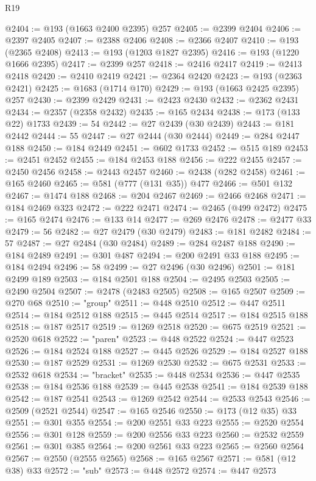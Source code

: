 \begin{lexlean}{R19}
\begin{coremodule}
@2404 := @193 (@1663 @2400 @2395) @257
@2405 := @2399 @2404
@2406 := @2397 @2405
@2407 := @2388 @2406
@2408 := @2366 @2407
@2410 := @193 (@2365 @2408)
@2413 := @193 (@1203 @1827 @2395)
@2416 := @193 (@1220 @1666 @2395)
@2417 := @2399 @257
@2418 := @2416 @2417
@2419 := @2413 @2418
@2420 := @2410 @2419
@2421 := @2364 @2420
@2423 := @193 (@2363 @2421)
@2425 := @1683 (@1714 @170)
@2429 := @193 (@1663 @2425 @2395) @257
@2430 := @2399 @2429
@2431 := @2423 @2430
@2432 := @2362 @2431
@2434 := @2357 (@2358 @2432)
@2435 := @165 @2434
@2438 := @173 (@133 @22) @1733
@2439 := 54
@2442 := @27 @2439 (@30 @2439)
@2443 := @181 @2442
@2444 := 55
@2447 := @27 @2444 (@30 @2444)
@2449 := @284 @2447 @188
@2450 := @184 @2449
@2451 := @602 @1733
@2452 := @515 @189
@2453 := @2451 @2452
@2455 := @184 @2453 @188
@2456 := @222 @2455
@2457 := @2450 @2456
@2458 := @2443 @2457
@2460 := @2438 (@282 @2458)
@2461 := @165 @2460
@2465 := @581 (@777 (@131 @35)) @477
@2466 := @501 @132
@2467 := @1474 @188
@2468 := @204 @2467
@2469 := @2466 @2468
@2471 := @184 @2469 @323
@2472 := @222 @2471
@2474 := @2465 (@499 @2472)
@2475 := @165 @2474
@2476 := @133 @14
@2477 := @269 @2476
@2478 := @2477 @33
@2479 := 56
@2482 := @27 @2479 (@30 @2479)
@2483 := @181 @2482
@2484 := 57
@2487 := @27 @2484 (@30 @2484)
@2489 := @284 @2487 @188
@2490 := @184 @2489
@2491 := @301 @487
@2494 := @200 @2491 @33 @188
@2495 := @184 @2494
@2496 := 58
@2499 := @27 @2496 (@30 @2496)
@2501 := @181 @2499 @189
@2503 := @184 @2501 @188
@2504 := @2495 @2503
@2505 := @2490 @2504
@2507 := @2478 (@2483 @2505)
@2508 := @165 @2507
@2509 := @270 @68
@2510 := "group"
@2511 := @448 @2510
@2512 := @447 @2511
@2514 := @184 @2512 @188
@2515 := @445 @2514
@2517 := @184 @2515 @188
@2518 := @187 @2517
@2519 := @1269 @2518
@2520 := @675 @2519
@2521 := @2520 @618
@2522 := "paren"
@2523 := @448 @2522
@2524 := @447 @2523
@2526 := @184 @2524 @188
@2527 := @445 @2526
@2529 := @184 @2527 @188
@2530 := @187 @2529
@2531 := @1269 @2530
@2532 := @675 @2531
@2533 := @2532 @618
@2534 := "bracket"
@2535 := @448 @2534
@2536 := @447 @2535
@2538 := @184 @2536 @188
@2539 := @445 @2538
@2541 := @184 @2539 @188
@2542 := @187 @2541
@2543 := @1269 @2542
@2544 := @2533 @2543
@2546 := @2509 (@2521 @2544)
@2547 := @165 @2546
@2550 := @173 (@12 @35) @33
@2551 := @301 @355
@2554 := @200 @2551 @33 @223
@2555 := @2520 @2554
@2556 := @301 @128
@2559 := @200 @2556 @33 @223
@2560 := @2532 @2559
@2561 := @301 @385
@2564 := @200 @2561 @33 @223
@2565 := @2560 @2564
@2567 := @2550 (@2555 @2565)
@2568 := @165 @2567
@2571 := @581 (@12 @38) @33
@2572 := "sub"
@2573 := @448 @2572
@2574 := @447 @2573

\end{coremodule}
\end{lexlean}
